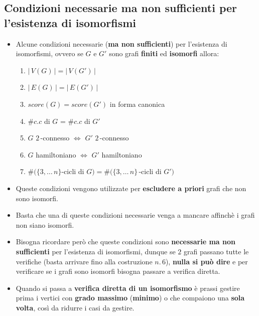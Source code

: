 \documentclass[10pt]{article}
\begin{document}
	\subsection{Condizioni necessarie ma non sufficienti per l'esistenza di isomorfismi}
	\begin{itemize}
	\item
	Alcune condizioni necessarie (\textbf{ma non sufficienti}) per l'esistenza di isomorfismi, ovvero se $G$ e $G'$ sono grafi \textbf{finiti} ed \textbf{isomorfi} allora:
	\begin{enumerate}
	\item
	$|\,V(G)\,| = |\,V(G')\,|$
	\item
	$|\,E(G)\,| = |\,E(G')\,|$
	\item
	$score(G) = score(G')$ {\tiny{in forma canonica}}
	\item
	$\#c.c$ di $G$ = $\# c.c$ di $G'$
	\item
	$G$ $2\,$-connesso $\Longleftrightarrow$ $G'$ $2\,$-connesso
	\item
	$G$ hamiltoniano $\Longleftrightarrow$ $G'$ hamiltoniano
	\item
	$\# (\{3,\dotso\,n\}$-cicli di $G) = \# (\{3,\dotso\,n\}\,$-cicli di $G')$
	\end{enumerate}
	\item
	Queste condizioni vengono utilizzate per \textbf{escludere a priori} grafi che non sono isomorfi.
	\item
	Basta che una di queste condizioni necessarie venga a mancare affinchè i grafi non siano isomorfi.
	\item
	Bisogna ricordare però che queste condizioni sono \textbf{necessarie ma non sufficienti} per l'esistenza di isomorfismi, dunque se $2$ grafi passano tutte le verifiche (basta arrivare fino alla costruzione $n. \,6$), \textbf{nulla si può dire} e per verificare se i grafi sono isomorfi bisogna passare a verifica diretta.
	\item
	Quando si passa a \textbf{verifica diretta di un isomorfismo} è prassi gestire prima i vertici con \textbf{grado massimo} (\textbf{minimo}) o che compaiono una \textbf{sola volta}, così da ridurre i casi da gestire.
	\end{itemize}
	
\end{document}
